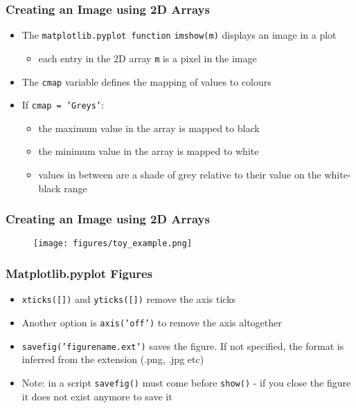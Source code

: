 \documentclass[english,14pt]{beamer}
\begin{document}
\begin{frame}[fragile]
\frametitle{Creating an Image using 2D Arrays}
    \begin{itemize}
		\item The \texttt{matplotlib.pyplot function} \texttt{imshow(m)} displays an image in a plot
		\begin{itemize}
     		\item each entry in the 2D array \texttt{m} is a pixel in the image
     	\end{itemize}
     		\item The \texttt{cmap} variable defines the mapping of values to colours
		\item If \texttt{cmap = 'Greys'}: 
			\begin{itemize}
			    \item the maximum value in the array is mapped to black
			    \item the minimum value in the array is mapped to white
			    \item values in between are a shade of grey relative to their value on the white-black range
			\end{itemize}
    \end{itemize}
\end{frame}

\begin{frame}[fragile]
\frametitle{Creating an Image using 2D Arrays}
 \vspace{-1em}
    \begin{figure} 
        \centering
        \texttt{[image: figures/toy\_example.png]}
   \end{figure}
\end{frame}


\begin{frame}[fragile]
\frametitle{Matplotlib.pyplot Figures }
    \begin{itemize}
		\item \texttt{xticks([])} and \texttt{yticks([])} remove the axis ticks
     	\item Another option is \texttt{axis('off')} to remove the axis altogether
     	\item \texttt{savefig('figurename.ext')} saves the figure. If not specified, the format is inferred from the extension (.png, .jpg etc)
        \item Note: in a script \texttt{savefig()} must come before \texttt{show()} - if you close the figure it does not exist anymore to save it 
    \end{itemize}
\end{frame}
\end{document}
